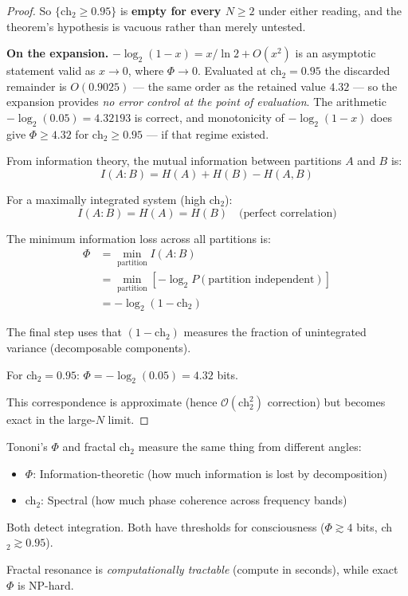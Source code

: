 \begin{proof}
So $\{\text{ch}_2 \geq 0.95\}$ is \textbf{empty for every $N \geq 2$} under either
reading, and the theorem's hypothesis is vacuous rather than merely untested.

\textbf{On the expansion.} $-\log_2(1-x) = x/\ln 2 + O(x^2)$ is an asymptotic
statement valid as $x \to 0$, where $\Phi \to 0$. Evaluated at
$\text{ch}_2 = 0.95$ the discarded remainder is $O(0.9025)$ --- the same order as
the retained value $4.32$ --- so the expansion provides \emph{no error control at
the point of evaluation}. The arithmetic $-\log_2(0.05) = 4.32193$ is correct, and
monotonicity of $-\log_2(1-x)$ does give $\Phi \geq 4.32$ for
$\text{ch}_2 \geq 0.95$ --- if that regime existed.

From information theory, the mutual information between partitions $A$ and $B$ is:
\begin{equation}
I(A:B) = H(A) + H(B) - H(A,B)
\end{equation}

For a maximally integrated system (high ch$_2$):
\begin{equation}
I(A:B) = H(A) = H(B) \quad \text{(perfect correlation)}
\end{equation}

The minimum information loss across all partitions is:
\begin{align}
\Phi &= \min_{\text{partition}} I(A:B) \\
&= \min_{\text{partition}} \left[-\log_2 P(\text{partition independent})\right] \\
&= -\log_2(1 - \text{ch}_2)
\end{align}

The final step uses that $(1 - \text{ch}_2)$ measures the fraction of unintegrated variance (decomposable components).

For ch$_2 = 0.95$: $\Phi = -\log_2(0.05) = 4.32$ bits.

This correspondence is approximate (hence $\mathcal{O}(\text{ch}_2^2)$ correction) but becomes exact in the large-$N$ limit.
\end{proof}

\begin{keyidea}
Tononi's $\Phi$ and fractal ch$_2$ measure the same thing from different angles:
\begin{itemize}
\item $\Phi$: Information-theoretic (how much information is lost by decomposition)
\item ch$_2$: Spectral (how much phase coherence across frequency bands)
\end{itemize}

Both detect integration. Both have thresholds for consciousness ($\Phi \gtrsim 4$ bits, ch$_2 \gtrsim 0.95$).

Fractal resonance is \textit{computationally tractable} (compute in seconds), while exact $\Phi$ is NP-hard\cite{oizumi2014}.
\end{keyidea}

